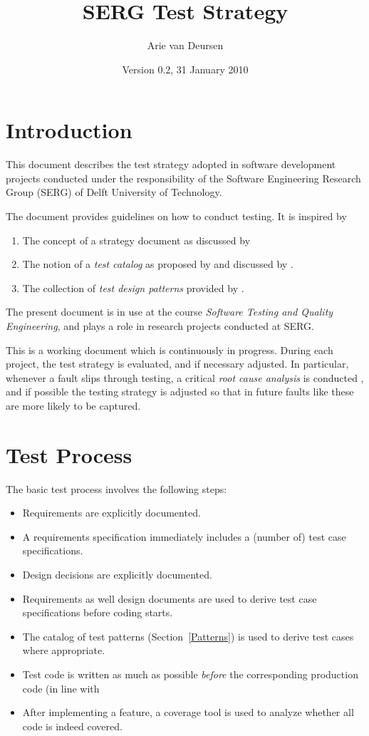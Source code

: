\documentclass{article}
\title{SERG Test Strategy}
\author{Arie van Deursen}
\date{Version 0.2, 31 January 2010}
\begin{document}
\maketitle

\section{Introduction}
This document describes the test strategy adopted in software
development projects conducted under the responsibility of the
Software Engineering Research Group (SERG) of 
Delft University of Technology.

The document provides guidelines on how to conduct testing.
It is inspired by 
\begin{enumerate}
\item The concept of a strategy document as discussed by 
\cite[Ch.~20]{Pezze:2008}
\item The notion of a \emph{test catalog} as proposed by 
 \cite{Marick:1995} and discussed by \cite[Section~11.4]{Pezze:2008}.
\item The collection of \emph{test design patterns} provided by
 \cite{Binder:2000}.
\end{enumerate}

The present document is in use at the course \emph{Software Testing
and Quality Engineering}, and plays a role in research projects
conducted at SERG.

This is a working document which is continuously in progress.
During each project, the test strategy is evaluated, and if necessary
adjusted. In particular, whenever a fault slips through testing,
a critical \emph{root cause analysis} is conducted
\cite[Section 20.7]{Pezze:2008}, and if possible the testing strategy
is adjusted so that in future faults like these are more likely
to be captured.


\section{Test Process}

The basic test process involves the following steps:
\begin{itemize}
\item Requirements are explicitly documented.
\item A requirements specification immediately includes a (number of)
   test case specifications.
 \item Design decisions are explicitly documented.
 \item Requirements as well design documents are used to derive
  test case specifications before coding starts.
\item The catalog of test patterns (Section~\ref{Patterns}) is used
  to derive test cases where appropriate.
\item Test code is written as much as possible \emph{before} 
  the corresponding production code (in line with \cite{Beck:2003}
\item After implementing a feature, a coverage tool is used to analyze
  whether all code is indeed covered.
\end{itemize}
\end{document}

